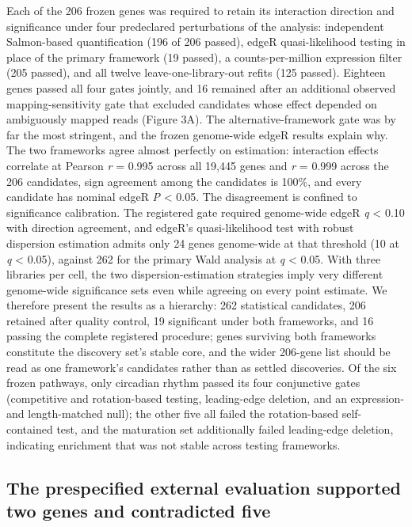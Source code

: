 \documentclass[12pt,letterpaper]{article}
\begin{document}
Each of the 206 frozen genes was required to retain its interaction direction and significance under four predeclared perturbations of the analysis: independent Salmon-based quantification (196 of 206 passed), edgeR quasi-likelihood testing in place of the primary framework (19 passed), a counts-per-million expression filter (205 passed), and all twelve leave-one-library-out refits (125 passed). Eighteen genes passed all four gates jointly, and 16 remained after an additional observed mapping-sensitivity gate that excluded candidates whose effect depended on ambiguously mapped reads (Figure 3A). The alternative-framework gate was by far the most stringent, and the frozen genome-wide edgeR results explain why. The two frameworks agree almost perfectly on estimation: interaction effects correlate at Pearson \textit{r} = 0.995 across all 19,445 genes and \textit{r} = 0.999 across the 206 candidates, sign agreement among the candidates is 100\%, and every candidate has nominal edgeR \textit{P} < 0.05. The disagreement is confined to significance calibration. The registered gate required genome-wide edgeR \textit{q} < 0.10 with direction agreement, and edgeR's quasi-likelihood test with robust dispersion estimation admits only 24 genes genome-wide at that threshold (10 at \textit{q} < 0.05), against 262 for the primary Wald analysis at \textit{q} < 0.05. With three libraries per cell, the two dispersion-estimation strategies imply very different genome-wide significance sets even while agreeing on every point estimate. We therefore present the results as a hierarchy: 262 statistical candidates, 206 retained after quality control, 19 significant under both frameworks, and 16 passing the complete registered procedure; genes surviving both frameworks constitute the discovery set's stable core, and the wider 206-gene list should be read as one framework's candidates rather than as settled discoveries. Of the six frozen pathways, only circadian rhythm passed its four conjunctive gates (competitive and rotation-based testing, leading-edge deletion, and an expression- and length-matched null); the other five all failed the rotation-based self-contained test, and the maturation set additionally failed leading-edge deletion, indicating enrichment that was not stable across testing frameworks.

\subsection*{The prespecified external evaluation supported two genes and contradicted five}
\end{document}
